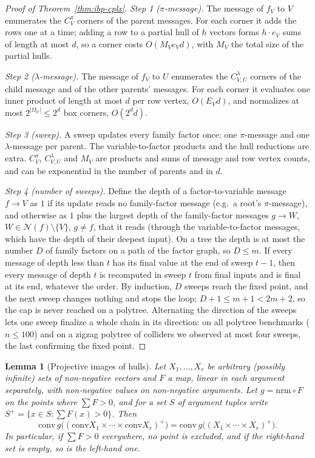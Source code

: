 \documentclass{article} %
\newtheorem{lemma}{Lemma}
\begin{document}
\begin{proof}[Proof of Theorem~\ref{thm:ibp-cplx}]
\emph{Step 1 ($\pi$-message).} The message of $f_V$ to $V$ enumerates the $C^\pi_V$ corners
of the parent messages. For each corner it adds the rows one at a time; adding a row to a
partial hull of $h$ vectors forms $h\cdot e_V$ sums of length at most $d$, so a corner costs
$O(M_Ve_Vd)$, with $M_V$ the total size of the partial hulls.

\emph{Step 2 ($\lambda$-message).} The message of $f_V$ to $U$ enumerates the
$C^\lambda_{V,U}$ corners of the child message and of the other parents' messages. For each
corner it evaluates one inner product of length at most $d$ per row vertex, $O(E_Vd)$, and
normalizes at most $2^{|\Omega_U|}\le2^d$ box corners, $O(2^dd)$.

\emph{Step 3 (sweep).} A sweep updates every family factor once: one $\pi$-message and one
$\lambda$-message per parent. The variable-to-factor products and the hull reductions are
extra. $C^\pi_V$, $C^\lambda_{V,U}$ and $M_V$ are products and sums of message and row
vertex counts, and can be exponential in the number of parents and in $d$.

\emph{Step 4 (number of sweeps).} Define the depth of a factor-to-variable message
$f\to V$ as $1$ if its update reads no family-factor message (e.g.\ a root's
$\pi$-message), and otherwise as $1$ plus the largest depth of the family-factor messages
$g\to W$, $W\in\mathcal N(f)\setminus\{V\}$, $g\ne f$, that it reads (through the
variable-to-factor messages, which have the depth of their deepest input). On a tree the depth is at most the number $D$
of family factors on a path of the factor graph, so $D\le m$. If every message of depth
less than $t$ has its final value at the end of sweep $t-1$, then every message of depth $t$
is recomputed in sweep $t$ from final inputs and is final at its end, whatever the order. By
induction, $D$ sweeps reach the fixed point, and the next sweep changes nothing and stops
the loop; $D+1\le m+1<2m+2$, so the cap is never reached on a polytree. Alternating the
direction of the sweeps lets one sweep finalize a whole chain in its direction: on all
polytree benchmarks ($n\le100$) and on a zigzag polytree of colliders we observed at most
four sweeps, the last confirming the fixed point.
\end{proof}

\begin{lemma}[Projective images of hulls]\label{lem:proj}
Let $X_1,\dots,X_r$ be arbitrary (possibly infinite) sets of non-negative vectors and $F$ a
map, linear in each argument separately, with non-negative values on non-negative arguments.
Let $g=\mathrm{nrm}\circ F$ on the points where $\sum F>0$, and for a set $S$ of argument
tuples write $S^+=\{x\in S:\sum F(x)>0\}$. Then
\[
  \mathrm{conv}\,g\bigl((\mathrm{conv}X_1\times\cdots\times\mathrm{conv}X_r)^+\bigr)
  =\mathrm{conv}\,g\bigl((X_1\times\cdots\times X_r)^+\bigr).
\]
In particular, if $\sum F>0$ everywhere, no point is excluded, and if the right-hand set is
empty, so is the left-hand one.
\end{lemma}
\end{document}
